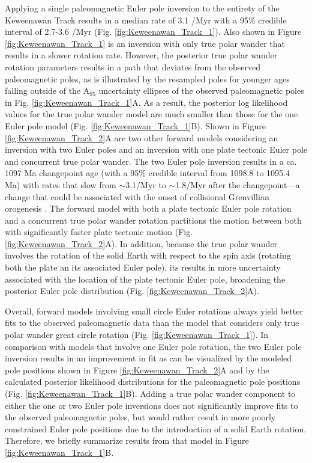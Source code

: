 \documentclass[11pt,letterpaper]{article}
\begin{document}
Applying a single paleomagnetic Euler pole inversion to the entirety of the Keweenawan Track results in a median rate of 3.1 \textdegree/Myr with a 95$\%$ credible interval of 2.7-3.6 \textdegree/Myr (Fig. \ref{fig:Keweenawan_Track_1}). Also shown in Figure \ref{fig:Keweenawan_Track_1} is an inversion with only true polar wander that results in a slower rotation rate. However, the posterior true polar wander rotation parameters results in a path that deviates from the observed paleomagnetic poles, as is illustrated by the resampled poles for younger ages falling outside of the A$_95$ uncertainty ellipses of the observed paleomagnetic poles in Fig. \ref{fig:Keweenawan_Track_1}A. As a result, the posterior log likelihood values for the true polar wander model are much smaller than those for the one Euler pole model (Fig. \ref{fig:Keweenawan_Track_1}B). Shown in Figure \ref{fig:Keweenawan_Track_2}A are two other forward models considering an inversion with two Euler poles and an inversion with one plate tectonic Euler pole and concurrent true polar wander. The two Euler pole inversion results in a ca. 1097 Ma changepoint age (with a 95\% credible interval from 1098.8 to 1095.4 Ma) with rates that slow from $\sim$3.1\textdegree /Myr to $\sim$1.8\textdegree /Myr after the changepoint---a change that could be associated with the onset of collisional Grenvillian orogenesis \citep{Swanson-Hysell2019a}. The forward model with both a plate tectonic Euler pole rotation and a concurrent true polar wander rotation partitions the motion between both with significantly faster plate tectonic motion (Fig. \ref{fig:Keweenawan_Track_2}A). In addition, because the true polar wander involves the rotation of the solid Earth with respect to the spin axis (rotating both the plate an its associated Euler pole), its results in more uncertainty associated with the location of the plate tectonic Euler pole, broadening the posterior Euler pole distribution (Fig. \ref{fig:Keweenawan_Track_2}A).

Overall, forward models involving small circle Euler rotations always yield better fits to the observed paleomagnetic data than the model that considers only true polar wander great circle rotation (Fig. \ref{fig:Keweenawan_Track_1}). In comparison with models that involve one Euler pole rotation, the two Euler pole inversion results in an improvement in fit as can be visualized by the modeled pole positions shown in Figure \ref{fig:Keweenawan_Track_2}A and by the calculated posterior likelihood distributions for the paleomagnetic pole positions (Fig. \ref{fig:Keweenawan_Track_1}B). Adding a true polar wander component to either the one or two Euler pole inversions does not significantly improve fits to the observed paleomagnetic poles, but would rather result in more poorly constrained Euler pole positions due to the introduction of a solid Earth rotation. Therefore, we briefly summarize results from that model in Figure \ref{fig:Keweenawan_Track_1}B. 
\end{document}
